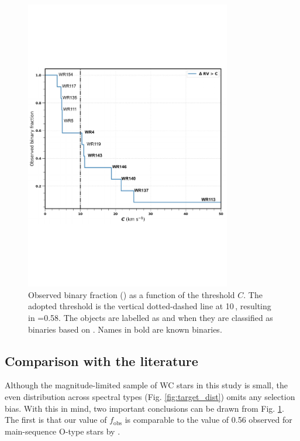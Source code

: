 \begin{figure}
\centering
\includegraphics[width=9cm]{chapters/WC/image/BinaryFractions_0503.pdf}
\caption{Observed binary fraction (\fobsWC{}) as a function of the threshold $C$. The adopted threshold is the vertical dotted-dashed line at 10\,\kms{}, resulting in \fobsWC{}=0.58. The objects are labelled as and when they are classified as binaries based on \DelRV{}. Names in bold are known binaries.}
\label{fig:bin_frac}
\end{figure}

\subsection{Comparison with the literature}\label{subsec:GWC_bin}
Although the magnitude-limited sample of WC stars in this study is small, the even distribution across spectral types (Fig. \ref{fig:target_dist}) omits any selection bias. With this in mind, two important conclusions can be drawn from Fig. \ref{fig:bin_frac}. The first is that our value of $f_{\textrm{obs}}$ is comparable to the value of 0.56 observed for main-sequence O-type stars by \citet{sana_binary_2012}.

